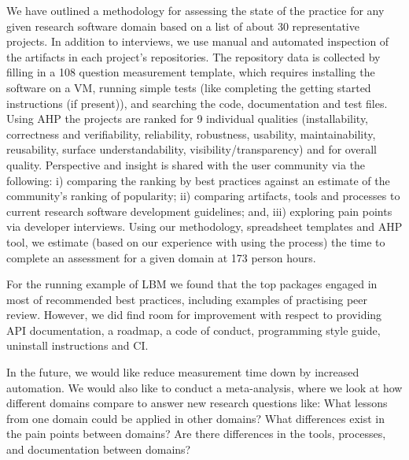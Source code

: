 \documentclass[runningheads]{llncs}
\begin{document}
We have outlined a methodology for assessing the state of the practice for any
given research software domain based on a list of about 30 representative
projects.  In addition to interviews, we use manual and automated inspection of
the artifacts in each project's repositories.  The repository data is collected
by filling in a 108 question measurement template, which requires installing the
software on a VM, running simple tests (like completing the getting started
instructions (if present)), and searching the code, documentation and test
files. Using AHP the projects are ranked for 9 individual qualities
(installability, correctness and verifiability, reliability, robustness,
usability, maintainability, reusability, surface understandability,
visibility/transparency) and for overall quality.  Perspective and insight is
shared with the user community via the following: i) comparing the ranking by
best practices against an estimate of the community's ranking of popularity; ii)
comparing artifacts, tools and processes to current research software
development guidelines; and, iii) exploring pain points via developer
interviews. Using our methodology, spreadsheet templates and AHP tool, we
estimate (based on our experience with using the process) the time to complete
an assessment for a given domain at 173 person hours.

For the running example of LBM we found that the top packages engaged in most of
recommended best practices, including examples of practising peer review.
However, we did find room for improvement with respect to providing API
documentation, a roadmap, a code of conduct, programming style guide, uninstall
instructions and CI.

In the future, we would like reduce measurement time down by increased
automation.  We would also like to conduct a meta-analysis, where we look at how
different domains compare to answer new research questions like: What lessons
from one domain could be applied in other domains? What differences exist in the
pain points between domains?  Are there differences in the tools, processes, and
documentation between domains?

%
%
%


%




\end{document}
